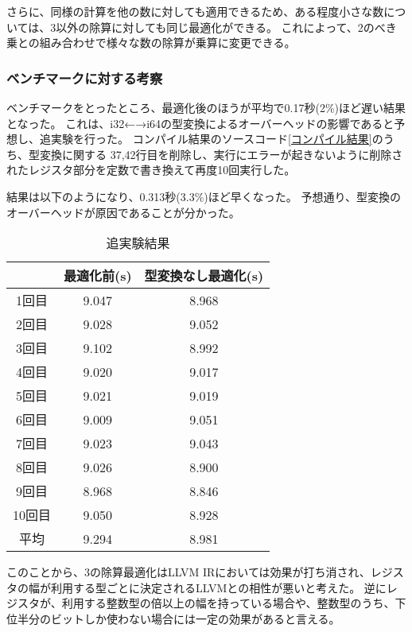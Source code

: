 さらに、同様の計算を他の数に対しても適用できるため、ある程度小さな数については、3以外の除算に対しても同じ最適化ができる。
これによって、2のべき乗との組み合わせで様々な数の除算が乗算に変更できる。

\subsubsection{ベンチマークに対する考察}
ベンチマークをとったところ、最適化後のほうが平均で0.17秒(2\%)ほど遅い結果となった。
これは、i32←→i64の型変換によるオーバーヘッドの影響であると予想し、追実験を行った。
コンパイル結果のソースコード\ref{コンパイル結果}のうち、型変換に関する
37,42行目を削除し、実行にエラーが起きないように削除されたレジスタ部分を定数で書き換えて再度10回実行した。

結果は以下のようになり、0.313秒(3.3\%)ほど早くなった。
予想通り、型変換のオーバーヘッドが原因であることが分かった。
\begin{table}[H]
  \centering
  \label{追実験結果}
  \caption{追実験結果}
  \begin{tabular}{|c|c|c|}
    \hline
           & 最適化前(s) & 型変換なし最適化(s) \\ \hline
    1回目  & 9.047       & 8.968               \\ \hline
    2回目  & 9.028       & 9.052               \\ \hline
    3回目  & 9.102       & 8.992               \\ \hline
    4回目  & 9.020       & 9.017               \\ \hline
    5回目  & 9.021       & 9.019               \\ \hline
    6回目  & 9.009       & 9.051               \\ \hline
    7回目  & 9.023       & 9.043               \\ \hline
    8回目  & 9.026       & 8.900               \\ \hline
    9回目  & 8.968       & 8.846               \\ \hline
    10回目 & 9.050       & 8.928               \\ \hline
    平均   & 9.294       & 8.981               \\ \hline
  \end{tabular}
\end{table}

このことから、3の除算最適化はLLVM IRにおいては効果が打ち消され、レジスタの幅が利用する型ごとに決定されるLLVMとの相性が悪いと考えた。
逆にレジスタが、利用する整数型の倍以上の幅を持っている場合や、整数型のうち、下位半分のビットしか使わない場合には一定の効果があると言える。
